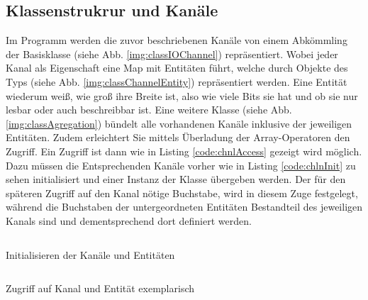 \subsection{Klassenstrukrur und Kanäle}\label{kap:ums:klassen}
Im Programm werden die zuvor beschriebenen Kanäle von einem Abkömmling der Basisklasse  (siehe Abb. \ref{img:classIOChannel}) repräsentiert. Wobei jeder Kanal als Eigenschaft eine Map mit Entitäten führt, welche durch Objekte des Typs  (siehe Abb. \ref{img:classChannelEntity}) repräsentiert werden. Eine Entität wiederum weiß, wie groß ihre Breite ist, also wie viele Bits sie hat und ob sie nur lesbar oder auch beschreibbar ist. Eine weitere Klasse  (siehe Abb. \ref{img:classAgregation}) bündelt alle vorhandenen Kanäle inklusive der jeweiligen Entitäten. Zudem erleichtert Sie mittels Überladung der Array-Operatoren den Zugriff. Ein Zugriff ist dann wie in Listing \ref{code:chnlAccess} gezeigt wird möglich. Dazu müssen die Entsprechenden Kanäle vorher wie in Listing \ref{code:chlnInit} zu sehen initialisiert und einer Instanz der Klasse  übergeben werden. Der für den späteren Zugriff auf den Kanal nötige Buchstabe, wird in diesem Zuge festgelegt, während die Buchstaben der untergeordneten Entitäten Bestandteil des jeweiligen Kanals sind und dementsprechend dort definiert werden. 


\begin{listing}[H]
	\inputminted[numbersep=1pt,fontsize=\scriptsize,frame=single, firstline=364,lastline=369]{c}{./code/main-klassenstruktur.cpp}
	\caption{Initialisieren der Kanäle und Entitäten}
	\label{code:chlnInit}
\end{listing}


\begin{listing}[H]
	\inputminted[numbersep=1pt,fontsize=\scriptsize,frame=single, firstline=415,lastline=416]{c}{./code/main-klassenstruktur.cpp}
	\caption{Zugriff auf Kanal und Entität exemplarisch}
	\label{code:chnlAccess}
\end{listing}


